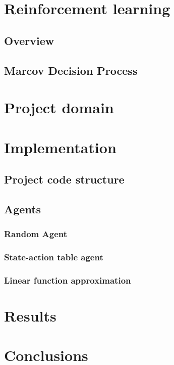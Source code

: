 \documentclass[12pt]{article}
\begin{document}

\tableofcontents
\pagebreak


\section{Reinforcement learning}{}
\subsection{Overview}
\subsection{Marcov Decision Process}
\newpage
\section{Project domain}

\newpage
\section{Implementation}
\subsection{Project code structure}
\subsection{Agents}
\subsubsection{Random Agent}
\subsubsection{State-action table agent}
\subsubsection{Linear function approximation}
\newpage
\section{Results}
\newpage
\section{Conclusions}

\newpage


\end{document}
